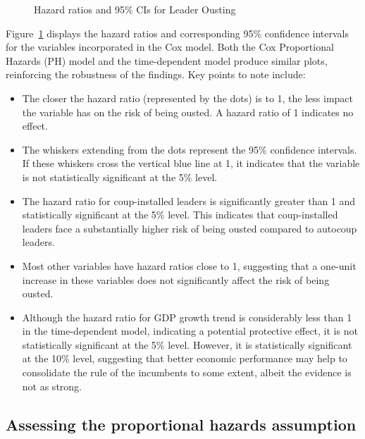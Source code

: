 \documentclass[
  12pt,
]{report}
\begin{document}
\begin{figure}
\begin{minipage}{0.50\linewidth}
{}


\end{minipage}%

\caption{\label{fig-coxHR}Hazard ratios and 95\% CIs for Leader Ousting}

\end{figure}%

Figure~\ref{fig-coxHR} displays the hazard ratios and corresponding 95\%
confidence intervals for the variables incorporated in the Cox model.
Both the Cox Proportional Hazards (PH) model and the time-dependent
model produce similar plots, reinforcing the robustness of the findings.
Key points to note include:

\begin{itemize}
\item
  The closer the hazard ratio (represented by the dots) is to 1, the
  less impact the variable has on the risk of being ousted. A hazard
  ratio of 1 indicates no effect.
\item
  The whiskers extending from the dots represent the 95\% confidence
  intervals. If these whiskers cross the vertical blue line at 1, it
  indicates that the variable is not statistically significant at the
  5\% level.
\item
  The hazard ratio for coup-installed leaders is significantly greater
  than 1 and statistically significant at the 5\% level. This indicates
  that coup-installed leaders face a substantially higher risk of being
  ousted compared to autocoup leaders.
\item
  Most other variables have hazard ratios close to 1, suggesting that a
  one-unit increase in these variables does not significantly affect the
  risk of being ousted.
\item
  Although the hazard ratio for GDP growth trend is considerably less
  than 1 in the time-dependent model, indicating a potential protective
  effect, it is not statistically significant at the 5\% level. However,
  it is statistically significant at the 10\% level, suggesting that
  better economic performance may help to consolidate the rule of the
  incumbents to some extent, albeit the evidence is not as strong.
\end{itemize}

\subsection{Assessing the proportional hazards
assumption}\label{assessing-the-proportional-hazards-assumption}
\end{document}
